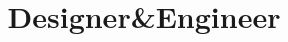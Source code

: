 \documentclass[11pt,a4paper,sans]{moderncv} %
\title{Designer\&Engineer
}
\begin{document}

\end{document}
